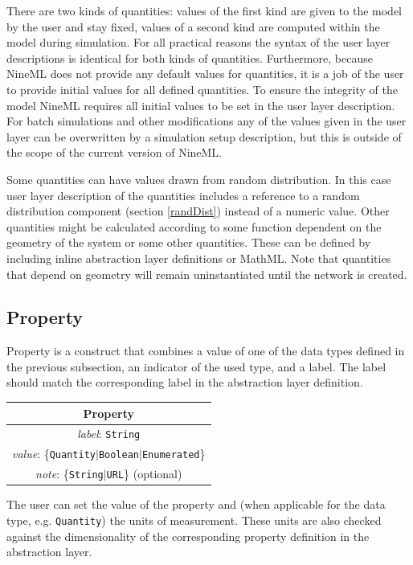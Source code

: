 \documentclass{article}
\begin{document}
There are two kinds of quantities: values of the first kind are given to the
model by the user and stay fixed, values of a second kind are computed within
the model during simulation. For all practical reasons the syntax of the user
layer descriptions is identical for both kinds of quantities. Furthermore,
because NineML does not provide any default values for quantities, it is a
job of the user to provide initial values for all defined quantities. To
ensure the integrity of the model NineML requires all initial values to be
set in the user layer description. For batch simulations and other
modifications any of the values given in the user layer can be overwritten
by a simulation setup description, but this is outside of the scope of the
current version of NineML.

Some quantities can have values drawn from random distribution. In this case
user layer description of the quantities includes a reference to a random
distribution component (section \ref{randDist}) instead of a numeric value.
Other quantities might be calculated according to some function dependent on
the geometry of the system or some other quantities. These can be defined by
including inline abstraction layer definitions or MathML. Note that quantities
that depend on geometry will remain uninstantiated until the network is
created.

\subsection{Property}

Property is a construct that combines a value of one of the data types
defined in the previous subsection, an indicator of the used type, and a
label. The label should match the corresponding label in the abstraction
layer definition.

\begin{table}[htb]
\center
\begin{tabular}{|c|}
\hline
\hline
Property \\
\hline
\hline
{\em label}: {\tt String} \\
\hline
{\em value}: \{{\tt Quantity}$|${\tt Boolean}$|${\tt Enumerated}\} \\
\hline
{\em note}: \{{\tt String}$|${\tt URL}\} (optional)\\
\hline
\end{tabular}
\end{table}

The user can set the value of the property and (when applicable for the data
type, e.g. {\tt Quantity}) the units of measurement. These units are also
checked against the dimensionality of the corresponding property definition
in the abstraction layer.
\end{document}
